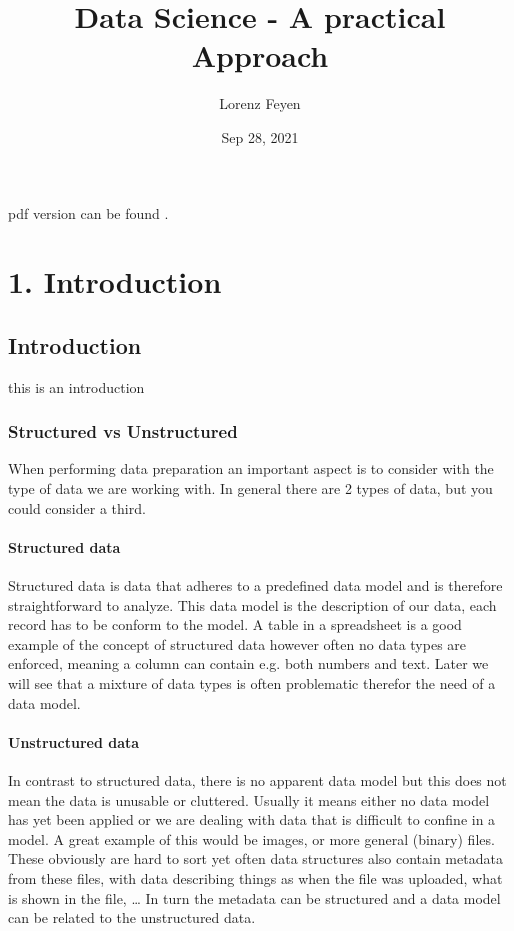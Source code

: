 \documentclass[letterpaper,10pt,english]{jupyterBook}
\title{Data Science - A practical Approach}
\date{Sep 28, 2021}
\author{Lorenz Feyen}
\begin{document}
\pagestyle{empty}
\sphinxmaketitle
\pagestyle{plain}
\sphinxtableofcontents
\pagestyle{normal}
\label{\detokenize{foreword::doc}}


\sphinxAtStartPar
pdf version can be found .


\part{1. Introduction}


\chapter{Introduction}
\label{\detokenize{c1_introduction/introduction:introduction}}\label{\detokenize{c1_introduction/introduction::doc}}
\sphinxAtStartPar
this is an introduction


\section{Structured vs Unstructured}
\label{\detokenize{c1_introduction/introduction:structured-vs-unstructured}}
\sphinxAtStartPar
When performing data preparation an important aspect is to consider with the type of data we are working with.
In general there are 2 types of data, but you could consider a third.


\subsection{Structured data}
\label{\detokenize{c1_introduction/introduction:structured-data}}
\sphinxAtStartPar
Structured data is data that adheres to a pre\sphinxhyphen{}defined data model and is therefore straightforward to analyze.
This data model is the description of our data, each record has to be conform to the model.
A table in a spreadsheet is a good example of the concept of structured data however often no data types are enforced, meaning a column can contain e.g. both numbers and text.
Later we will see that a mixture of data types is often problematic therefor the need of a data model.


\subsection{Unstructured data}
\label{\detokenize{c1_introduction/introduction:unstructured-data}}
\sphinxAtStartPar
In contrast to structured data, there is no apparent data model but this does not mean the data is unusable or cluttered.
Usually it means either no data model has yet been applied or we are dealing with data that is difficult to confine in a model.
A great example of this would be images, or more general (binary) files.
These obviously are hard to sort yet often data structures also contain metadata from these files, with data describing things as when the file was uploaded, what is shown in the file, …
In turn the metadata can be structured and a data model can be related to the unstructured data.
\end{document}

